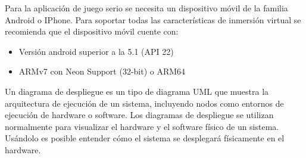 Para la aplicación de juego serio se necesita un dispositivo móvil de la familia Android o IPhone. Para soportar todas las características de inmersión virtual se recomienda que el dispositivo móvil cuente con:
\begin{itemize}
    \item Versión android superior a la 5.1 (API 22)
    \item ARMv7 con Neon Support (32-bit) o ARM64
\end{itemize}


Un diagrama de despliegue es un tipo de diagrama UML que muestra la arquitectura de ejecución de un sistema, incluyendo nodos como entornos de ejecución de hardware o software. Los diagramas de despliegue se utilizan normalmente para visualizar el hardware y el software físico de un sistema. Usándolo es posible entender cómo el sistema se desplegará físicamente en el hardware.

